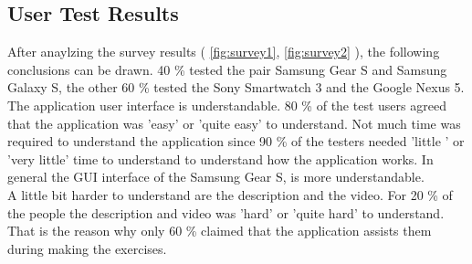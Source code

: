 \subsection{User Test Results}

After anaylzing the survey results ( \ref{fig:survey1}, \ref{fig:survey2} ), the following conclusions can be drawn. 40 \% tested the pair Samsung Gear S and Samsung Galaxy S, the other 60 \% tested the Sony Smartwatch 3 and the Google Nexus 5.
\\
The application user interface is understandable. 80 \% of the test users agreed that the application was 'easy' or 'quite easy' to understand. Not much time was required to understand the application since 90 \% of the testers needed 'little ' or 'very little' time to understand to understand how the application works. In general the GUI interface of the Samsung Gear S, is more understandable.\\
A little bit harder to understand are the description and the video. For 20 \% of the people the description and video was 'hard' or 'quite hard' to understand. That is the reason why only 60 \% claimed that the application assists them during making the exercises.
